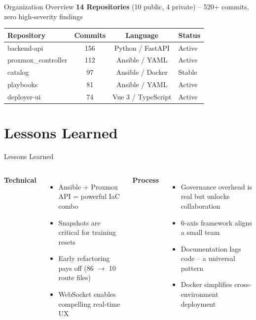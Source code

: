 \documentclass[aspectratio=169]{beamer}
\begin{document}
\begin{frame}{Organization Overview \; \faClipboardCheck}
  \textbf{14 Repositories} (10 public, 4 private) -- \alert{520+ commits}, zero high-severity findings\\[3mm]

  \begin{table}
    \footnotesize\color{cyber-ink}
    \begin{tabular}{l|ccl}
      \textbf{Repository} & \textbf{Commits} & \textbf{Language} & \textbf{Status} \\
      \hline
      backend-api & 156 & Python / FastAPI & Active \\
      proxmox\_controller & 112 & Ansible / YAML & Active \\
      catalog & 97 & Ansible / Docker & Stable \\
      playbooks & 81 & Ansible / YAML & Active \\
      deployer-ui & 74 & Vue 3 / TypeScript & Active \\
    \end{tabular}
  \end{table}
\end{frame}

\section{Lessons Learned}

\begin{frame}{Lessons Learned \; \faLightbulb}
  \begin{columns}[T]
    \textbf{Technical}
    \begin{itemize}
      \item \alert{Ansible + Proxmox API} = powerful IaC combo
      \item Snapshots are critical for training resets
      \item \alert{Early refactoring pays off} (86 $\rightarrow$ 10 route files)
      \item WebSocket enables compelling real-time UX
    \end{itemize}

    \textbf{Process}
    \begin{itemize}
      \item \alert{Governance overhead is real} but unlocks collaboration
      \item 6-axis framework aligns a small team
      \item Documentation lags code -- a universal pattern
      \item Docker simplifies cross-environment deployment
    \end{itemize}
  \end{columns}
\end{frame}
\end{document}
